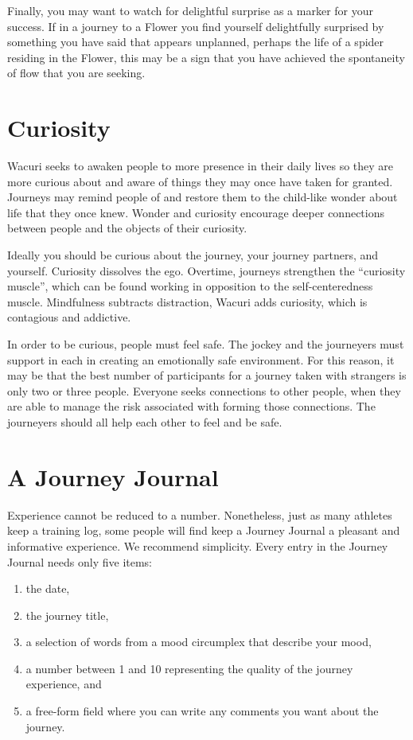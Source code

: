 \documentclass[12pt]{book}
\begin{document}
Finally, you may want to watch for delightful surprise as a marker for your success. If in a journey to a Flower you find yourself delightfully surprised by something you have said that appears unplanned, perhaps the life of a spider residing in the Flower, this may be a sign that you have achieved the spontaneity of flow that you are seeking.
				
			
\chapter{Curiosity}

Wacuri seeks to awaken people to more presence in their daily lives so they are more curious about and aware of things they may once have taken for granted. Journeys may remind people of and restore them to the child-like wonder about life that they once knew. Wonder and curiosity encourage deeper connections between people and the objects of their curiosity.
					
Ideally you should be curious about the journey, your journey partners, and yourself. Curiosity dissolves the ego. Overtime, journeys strengthen the “curiosity muscle”, which can be found working in opposition to the self-centeredness muscle. Mindfulness subtracts distraction, Wacuri adds curiosity, which is contagious and addictive.
					
In order to be curious, people must feel safe. The jockey and the journeyers must support in each in creating an emotionally safe environment. For this reason, it may be that the best number of participants for a journey taken with strangers is only two or three people. Everyone seeks connections to other people, when they are able to manage the risk associated with forming those connections. The journeyers should all help each other to feel and be safe.


\chapter{A Journey Journal}

Experience cannot be reduced to a number.  Nonetheless, just
as many athletes keep a training log, some people will find
keep a Journey Journal a pleasant and informative experience.
We recommend simplicity. Every entry in the Journey Journal
needs only five items:
\begin{enumerate}
\item the date,
\item the journey title,
\item a selection of words from a mood circumplex that
  describe your mood,
\item a number between 1 and 10 representing the quality of
  the journey experience, and
\item a free-form field where you can write any comments
  you want about the journey.
\end{enumerate}
\end{document}
